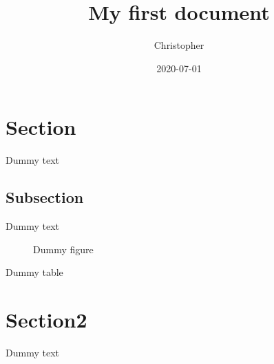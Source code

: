 \documentclass{article}
\title{My first document}
\date{2020-07-01}
\author{Christopher}
\begin{document}
	
	\doublespacing
	\tableofcontents
	\singlespacing
	
	\section{Section}
		Dummy text
	
		\subsection{Subsection}
			Dummy text
			
			\begin{figure}
				\caption{Dummy figure}
			\end{figure}
			
			\begin{table}
				\caption{Dummy table}
			\end{table}
	
	\section{Section2}
		Dummy text
	
	\begin{appendix}
		\listoffigures
		\listoftables
	\end{appendix}
\end{document}
